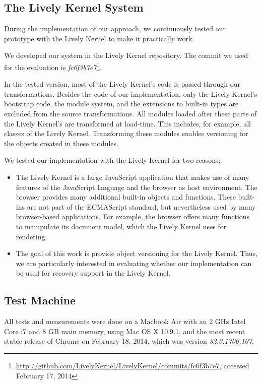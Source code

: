 \subsection{The Lively Kernel System}

During the implementation of our approach, we continuously tested our prototype with the Lively Kernel to make it practically work.

We developed our system in the Lively Kernel repository.
The commit we used for the evaluation is \emph{fc6f3b7e7}\footnote{\url{http://github.com/LivelyKernel/LivelyKernel/commits/fc6f3b7e7}, accessed February 17, 2014}.

In the tested version, most of the Lively Kernel's code is passed through our transformations.
Besides the code of our implementation, only the Lively Kernel's bootstrap code, the module system, and the extensions to built-in types are excluded from the source transformations.
All modules loaded after these parts of the Lively Kernel's are transformed at load-time.
This includes, for example, all classes of the Lively Kernel.
Transforming these modules enables versioning for the objects created in these modules.

We tested our implementation with the Lively Kernel for two reasons:

\begin{itemize}
    \item The Lively Kernel is a large JavaScript application that makes use of many features of the JavaScript language and the browser as host environment. The browser provides many additional built-in objects and functions. These built-ins are not part of the ECMAScript standard, but nevertheless used by many browser-based applications. For example, the browser offers many functions to manipulate its document model, which the Lively Kernel uses for rendering.
    \item The goal of this work is provide object versioning for the Lively Kernel. Thus, we are particularly interested in evaluating whether our implementation can be used for recovery support in the Lively Kernel.
\end{itemize}


\subsection{Test Machine}

All tests and measurements were done on a Macbook Air with an 2 GHz Intel Core i7 and 8 GB main memory, using Mac OS X 10.9.1, and the most recent stable release of Chrome on February 18, 2014, which was version \emph{32.0.1700.107}.

